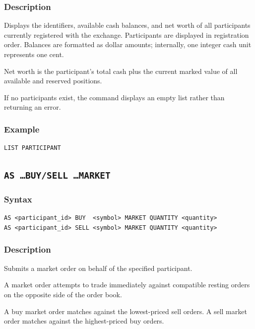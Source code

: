 \documentclass{article}
\begin{document}
\subsubsection*{Description}

Displays the identifiers, available cash balances, and net worth of all participants
currently registered with the exchange. Participants are displayed in
registration order. Balances are formatted as dollar amounts; internally,
one integer cash unit represents one cent.

Net worth is the participant's total cash plus the current marked value of
all available and reserved positions.

If no participants exist, the command displays an empty list rather than
returning an error.

\subsubsection*{Example}

\begin{lstlisting}
LIST PARTICIPANT
\end{lstlisting}

\subsection{\texttt{AS \ldots BUY/SELL \ldots MARKET}}

\subsubsection*{Syntax}

\begin{lstlisting}
AS <participant_id> BUY  <symbol> MARKET QUANTITY <quantity>
AS <participant_id> SELL <symbol> MARKET QUANTITY <quantity>
\end{lstlisting}

\subsubsection*{Description}

Submits a market order on behalf of the specified participant.

A market order attempts to trade immediately against compatible resting
orders on the opposite side of the order book.

A buy market order matches against the lowest-priced sell orders. A sell
market order matches against the highest-priced buy orders.
\end{document}
